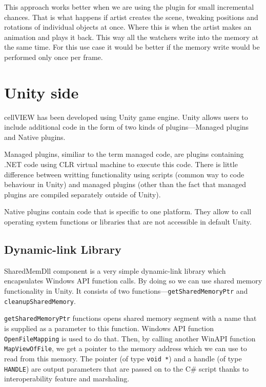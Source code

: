 \documentclass[
  digital, %
  table,   %
  nolof,     %
  nolot,     %
]{fithesis3}
\begin{document}
This approach works better when we are using the plugin for small incremental chances. That is what happens if artist creates the scene, tweaking positions and rotations of individual objects at once. Where this is when the artist makes an animation and plays it back. This way all the watchers write into the memory at the same time. For this use case it would be better if the memory write would be performed only once per frame.

\section{Unity side}
cellVIEW has been developed using Unity game engine. Unity allows users to include additional code in the form of two kinds of plugins—Managed plugins and Native plugins.

Managed plugins, similiar to the term managed code, are plugins containing .NET code using CLR virtual machine to execute this code. There is little difference between writting functionality using scripts (common way to code behaviour in Unity) and managed plugins (other than the fact that managed plugins are compiled separately outside of Unity).

Native plugins contain code that is specific to one platform. They allow to call operating system functions or libraries that are not accessible in default Unity.

\subsection{Dynamic-link Library}
SharedMemDll component is a very simple dynamic-link library which encapsulates Windows API function calls. By doing so we can use shared memory functionality in Unity. It consists of two functions—\texttt{get\-Shared\-Memory\-Ptr} and \texttt{cleanup\-Shared\-Memory}.

\texttt{getSharedMemoryPtr} functions opens shared memory segment with a name that is supplied as a parameter to this function. Windows API function \texttt{OpenFileMapping} is used to do that. Then, by calling another WinAPI function \texttt{MapViewOfFile}, we get a pointer to the memory address which we can use to read from this memory. The pointer (of type \texttt{void *}) and a handle (of type \texttt{HANDLE}) are output parameters that are passed on to the C\# script thanks to interoperability feature and marshaling.
\end{document}
